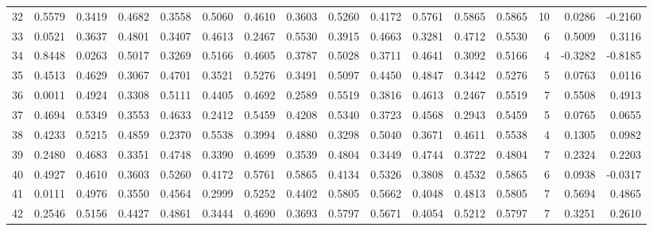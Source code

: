 \begin{tabular}{lrrrrrrrrrrrrrrr}
32  &      0.5579 &  0.3419 &  0.4682 &  0.3558 &  0.5060 &  0.4610 &  0.3603 &  0.5260 &  0.4172 &  0.5761 &   0.5865 &     0.5865 &     10 &                    0.0286 &                    -0.2160 \\
33  &      0.0521 &  0.3637 &  0.4801 &  0.3407 &  0.4613 &  0.2467 &  0.5530 &  0.3915 &  0.4663 &  0.3281 &   0.4712 &     0.5530 &      6 &                    0.5009 &                     0.3116 \\
34  &      0.8448 &  0.0263 &  0.5017 &  0.3269 &  0.5166 &  0.4605 &  0.3787 &  0.5028 &  0.3711 &  0.4641 &   0.3092 &     0.5166 &      4 &                   -0.3282 &                    -0.8185 \\
35  &      0.4513 &  0.4629 &  0.3067 &  0.4701 &  0.3521 &  0.5276 &  0.3491 &  0.5097 &  0.4450 &  0.4847 &   0.3442 &     0.5276 &      5 &                    0.0763 &                     0.0116 \\
36  &      0.0011 &  0.4924 &  0.3308 &  0.5111 &  0.4405 &  0.4692 &  0.2589 &  0.5519 &  0.3816 &  0.4613 &   0.2467 &     0.5519 &      7 &                    0.5508 &                     0.4913 \\
37  &      0.4694 &  0.5349 &  0.3553 &  0.4633 &  0.2412 &  0.5459 &  0.4208 &  0.5340 &  0.3723 &  0.4568 &   0.2943 &     0.5459 &      5 &                    0.0765 &                     0.0655 \\
38  &      0.4233 &  0.5215 &  0.4859 &  0.2370 &  0.5538 &  0.3994 &  0.4880 &  0.3298 &  0.5040 &  0.3671 &   0.4611 &     0.5538 &      4 &                    0.1305 &                     0.0982 \\
39  &      0.2480 &  0.4683 &  0.3351 &  0.4748 &  0.3390 &  0.4699 &  0.3539 &  0.4804 &  0.3449 &  0.4744 &   0.3722 &     0.4804 &      7 &                    0.2324 &                     0.2203 \\
40  &      0.4927 &  0.4610 &  0.3603 &  0.5260 &  0.4172 &  0.5761 &  0.5865 &  0.4134 &  0.5326 &  0.3808 &   0.4532 &     0.5865 &      6 &                    0.0938 &                    -0.0317 \\
41  &      0.0111 &  0.4976 &  0.3550 &  0.4564 &  0.2999 &  0.5252 &  0.4402 &  0.5805 &  0.5662 &  0.4048 &   0.4813 &     0.5805 &      7 &                    0.5694 &                     0.4865 \\
42  &      0.2546 &  0.5156 &  0.4427 &  0.4861 &  0.3444 &  0.4690 &  0.3693 &  0.5797 &  0.5671 &  0.4054 &   0.5212 &     0.5797 &      7 &                    0.3251 &                     0.2610 \\

\end{tabular}
